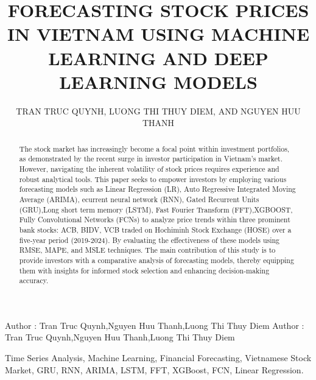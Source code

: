 \documentclass{ieeeojies}
\begin{document}
\title{FORECASTING STOCK PRICES IN VIETNAM USING MACHINE LEARNING AND DEEP LEARNING MODELS}

\author{\uppercase{Tran Truc Quynh},
\uppercase{Luong Thi Thuy Diem, and Nguyen Huu Thanh}}

\address[1]{Faculty of Information Systems, University of Information Technology, (e-mail: 21522539@gm.uit.edu.vn)}
\address[2]{Faculty of Information Systems, University of Information Technology, (e-mail: 21521953@gm.uit.edu.vn)}
\address[3]{Faculty of Information Systems, University of Information Technology, (e-mail: 21522599@gm.uit.edu.vn)}

\markboth
{Author \headeretal: Tran Truc Quynh,Nguyen Huu Thanh,Luong Thi Thuy Diem}
{Author \headeretal: Tran Truc Quynh,Nguyen Huu Thanh,Luong Thi Thuy Diem}

\begin{abstract}
The stock market has increasingly become a focal point within investment portfolios, as demonstrated by the recent surge in investor participation in Vietnam’s market. However, navigating the inherent volatility of stock prices requires experience and robust analytical tools. This paper seeks to empower investors by employing various forecasting models such as Linear Regression (LR), Auto Regressive Integrated Moving Average (ARIMA), ecurrent neural network (RNN), Gated Recurrent Units (GRU),Long short term memory (LSTM), Fast Fourier Transform (FFT),XGBOOST, Fully Convolutional Networks (FCNs) to analyze price trends within three prominent bank stocks: ACB, BIDV, VCB traded on Hochiminh Stock Exchange (HOSE) over a five-year period (2019-2024). By evaluating the effectiveness of these models using RMSE, MAPE, and MSLE techniques. The main contribution of this study is to provide investors with a comparative analysis of forecasting models, thereby equipping them with insights for informed stock selection and enhancing decision-making accuracy.
\end{abstract}

\begin{keywords}
Time Series Analysis, Machine Learning, Financial Forecasting, Vietnamese Stock Market, GRU, RNN, ARIMA, LSTM, FFT, XGBoost, FCN, Linear Regression.
\end{keywords}

\titlepgskip=-15pt

\maketitle
\end{document}
